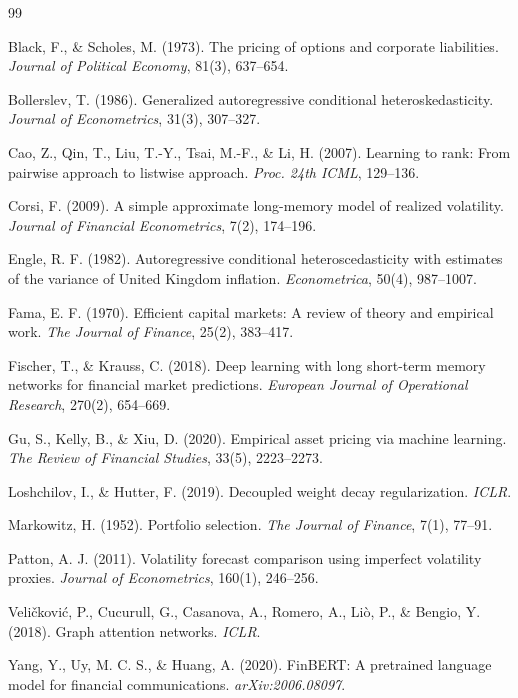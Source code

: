 \documentclass[10pt, twocolumn, a4paper]{article}
\begin{document}
\begin{thebibliography}{99}

Black, F., \& Scholes, M. (1973).
The pricing of options and corporate liabilities.
\textit{Journal of Political Economy}, 81(3), 637--654.

Bollerslev, T. (1986).
Generalized autoregressive conditional heteroskedasticity.
\textit{Journal of Econometrics}, 31(3), 307--327.

Cao, Z., Qin, T., Liu, T.-Y., Tsai, M.-F., \& Li, H. (2007).
Learning to rank: From pairwise approach to listwise approach.
\textit{Proc. 24th ICML}, 129--136.

Corsi, F. (2009).
A simple approximate long-memory model of realized volatility.
\textit{Journal of Financial Econometrics}, 7(2), 174--196.

Engle, R. F. (1982).
Autoregressive conditional heteroscedasticity with estimates of the
variance of United Kingdom inflation.
\textit{Econometrica}, 50(4), 987--1007.

Fama, E. F. (1970).
Efficient capital markets: A review of theory and empirical work.
\textit{The Journal of Finance}, 25(2), 383--417.

Fischer, T., \& Krauss, C. (2018).
Deep learning with long short-term memory networks for financial market
predictions.
\textit{European Journal of Operational Research}, 270(2), 654--669.

Gu, S., Kelly, B., \& Xiu, D. (2020).
Empirical asset pricing via machine learning.
\textit{The Review of Financial Studies}, 33(5), 2223--2273.

Loshchilov, I., \& Hutter, F. (2019).
Decoupled weight decay regularization.
\textit{ICLR}.

Markowitz, H. (1952).
Portfolio selection.
\textit{The Journal of Finance}, 7(1), 77--91.

Patton, A. J. (2011).
Volatility forecast comparison using imperfect volatility proxies.
\textit{Journal of Econometrics}, 160(1), 246--256.

Veli\v{c}kovi\'{c}, P., Cucurull, G., Casanova, A., Romero, A.,
Li\`{o}, P., \& Bengio, Y. (2018).
Graph attention networks.
\textit{ICLR}.

Yang, Y., Uy, M. C. S., \& Huang, A. (2020).
FinBERT: A pretrained language model for financial communications.
\textit{arXiv:2006.08097}.

\end{thebibliography}
\end{document}
